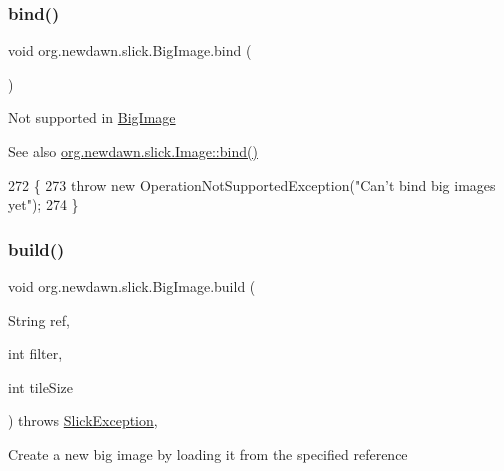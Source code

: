 \subsubsection{\texorpdfstring{bind()}{bind()}}
{\footnotesize\ttfamily void org.\+newdawn.\+slick.\+Big\+Image.\+bind (\begin{DoxyParamCaption}{ }\end{DoxyParamCaption})\hspace{0.3cm}{\ttfamily [inline]}}

Not supported in \mbox{\hyperlink{classorg_1_1newdawn_1_1slick_1_1_big_image}{Big\+Image}}

\begin{DoxySeeAlso}{See also}
\mbox{\hyperlink{classorg_1_1newdawn_1_1slick_1_1_image_ad5e41640d7b1b235926f3d248935e694}{org.\+newdawn.\+slick.\+Image\+::bind()}} 
\end{DoxySeeAlso}

\begin{DoxyCode}
272                        \{
273         \textcolor{keywordflow}{throw} \textcolor{keyword}{new} OperationNotSupportedException(\textcolor{stringliteral}{"Can't bind big images yet"});
274     \}
\end{DoxyCode}
\mbox{\label{classorg_1_1newdawn_1_1slick_1_1_big_image_a22a00890a41ddf7c996a84b2bc32621b}} 
\subsubsection{\texorpdfstring{build()}{build()}\hspace{0.1cm}{\footnotesize\ttfamily [1/2]}}
{\footnotesize\ttfamily void org.\+newdawn.\+slick.\+Big\+Image.\+build (\begin{DoxyParamCaption}\item[{String}]{ref,  }\item[{int}]{filter,  }\item[{int}]{tile\+Size }\end{DoxyParamCaption}) throws \mbox{\hyperlink{classorg_1_1newdawn_1_1slick_1_1_slick_exception}{Slick\+Exception}}\hspace{0.3cm}{\ttfamily [inline]}, {\ttfamily [private]}}

Create a new big image by loading it from the specified reference


